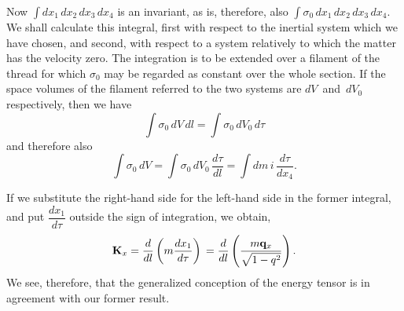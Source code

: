 \documentclass[12pt]{book}[2005/09/16]
\newcommand{\Change}[2]{#2}
\newcommand{\PageSep}[1]{\ignorespaces}
\newcommand{\Vector}[1]{\mathbf{#1}}
\newcommand{\veci}{\Vector{i}}
\newcommand{\q}{\Vector{q}}
\newcommand{\K}{\Vector{K}}
\begin{document}
Now $\int dx_{1}\, dx_{2}\, dx_{3}\, dx_{4}$ is an invariant, as is, therefore, also
$\int \sigma_{0}\, dx_{1}\, dx_{2}\, dx_{3}\, dx_{4}$. We shall calculate this integral, first
with respect to the inertial system which we have chosen,
and second, with respect to a system relatively to which
the matter has the velocity zero. The integration is to
be extended over a filament of the thread for which $\sigma_{0}$
may be regarded as constant over the whole section. If
the space volumes of the filament referred to the two
systems are $dV$~and~$dV_{0}$ respectively, then we have
\[
\int \sigma_{0}\, dV\, dl = \int \sigma_{0}\, dV_{0}\, d\tau
\]
and therefore also
\[
\int \sigma_{0}\, dV = \int \sigma_{0}\, dV_{0}\, \frac{d\tau}{dl}
  = \int dm\, \Change{\veci}{i}\, \frac{d\tau}{dx_{4}}.
\]

If we substitute the right-hand side for the left-hand
side in the former integral, and put $\dfrac{dx_{1}}{d\tau}$ outside the sign
\PageSep{59}
of integration, we obtain,
\[
\K_{x} = \frac{d}{dl}\left(m \frac{dx_{1}}{d\tau}\right) \\
  = \frac{d}{dl}\left(\frac{m\q_{x}}{\sqrt{1 - q^{2}}}\right).
\]
We see, therefore, that the generalized conception of the
energy tensor is in agreement with our former result.
\end{document}
